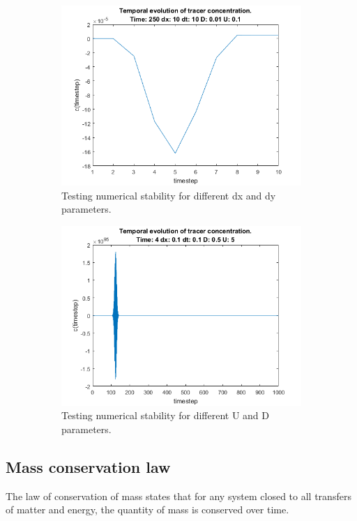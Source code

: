 \documentclass[12pt]{article}
\begin{document}
\begin{figure}[H]
	\centering
	\begin{subfigure}[b]{0.8\textwidth}   
		\centering 
		\includegraphics[width=\textwidth]{stability1}
		{{\small Testing numerical stability for different dx and dy parameters.}}    
	\end{subfigure}
	\begin{subfigure}[b]{0.8\textwidth}   
		\centering 
		\includegraphics[width=\textwidth]{stability2}
		{{\small Testing numerical stability for different U and D parameters.}}    
	\end{subfigure}
\end{figure}


\subsection{Mass conservation law}
The law of conservation of mass states that for any system closed to all transfers of matter and energy, the quantity of mass is conserved over time.
\end{document}
